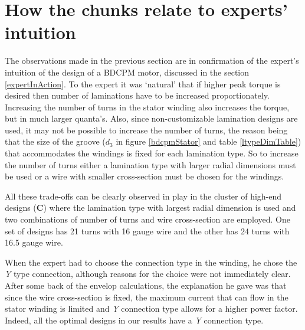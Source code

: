 \section{How the chunks relate to experts' intuition}
\label{bdcpmDiscuss}
The observations made in the previous section are in confirmation of the
expert's intuition of the design of a BDCPM motor, discussed in the section
\ref{expertInAction}. To the expert it was `natural' that if higher peak
torque is desired then number of laminations have to be increased
proportionately. Increasing the number of turns in the stator winding also
increases the torque, but in much larger quanta's. Also, since
non-customizable lamination designs are used, it may not be possible to
increase the number of turns, the reason being that the size of the groove
($d_3$ in figure \ref{bdcpmStator} and table \ref{ltypeDimTable}) that
accommodates the windings is fixed for each lamination type. So to increase
the number of turns either a lamination type with larger radial dimensions
must be used or a wire with smaller cross-section must be chosen for the
windings.

All these trade-offs can be clearly observed in play in the cluster of
high-end designs (\textbf{C}) where the lamination type with largest radial
dimension is used and two combinations of number of turns and wire
cross-section are employed. One set of designs has 21 turns with 16 gauge
wire and the other has 24 turns with 16.5 gauge wire.


When the expert had to choose the connection type in the winding, he chose
the {\em Y} type connection, although reasons for the choice were not
immediately clear. After some back of the envelop calculations, the
explanation he gave was that since the wire cross-section is fixed, the
maximum current that can flow in the stator winding is limited and {\em Y}
connection type allows for a higher power factor. Indeed, all the optimal
designs in our results have a {\em Y} connection type.
